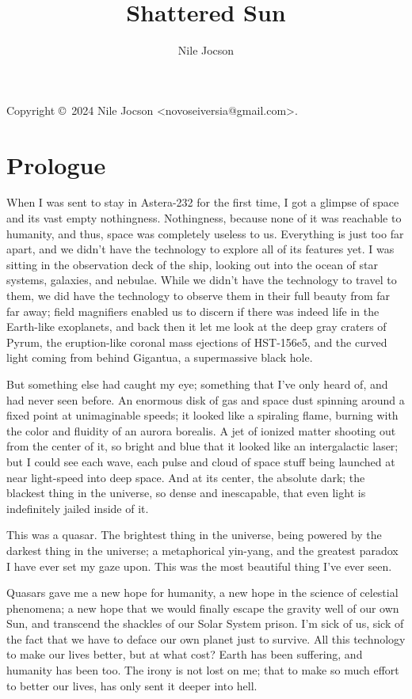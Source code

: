 \documentclass{book}
\title{Shattered Sun}
\author{Nile Jocson}
\begin{document}
	\frontmatter{}
		\maketitle{}

		Copyright \copyright{}~2024 Nile Jocson \textless{}novoseiversia@gmail.com\textgreater{}.



	\mainmatter{}
		\chapter*{Prologue}
			When I was sent to stay in Astera-232 for the first time, I got a glimpse of space and
			its vast empty nothingness. Nothingness, because none of it was reachable to humanity,
			and thus, space was completely useless to us. Everything is just too far apart, and we
			didn't have the technology to explore all of its features yet. I was sitting in the
			observation deck of the ship, looking out into the ocean of star systems, galaxies, and
			nebulae. While we didn't have the technology to travel to them, we did have the technology
			to observe them in their full beauty from far far away; field magnifiers enabled us to
			discern if there was indeed life in the Earth-like exoplanets, and back then it let me
			look at the deep gray craters of Pyrum, the eruption-like coronal mass ejections of
			HST-156e5, and the curved light coming from behind Gigantua, a supermassive black hole.

			But something else had caught my eye; something that I've only heard of, and had never
			seen before. An enormous disk of gas and space dust spinning around a fixed point at
			unimaginable speeds; it looked like a spiraling flame, burning with the color and fluidity
			of an aurora borealis. A jet of ionized matter shooting out from the center of it, so bright
			and blue that it looked like an intergalactic laser; but I could see each wave, each pulse
			and cloud of space stuff being launched at near light-speed into deep space. And at its
			center, the absolute dark; the blackest thing in the universe, so dense and inescapable,
			that even light is indefinitely jailed inside of it.

			This was a quasar. The brightest thing in the universe, being powered by the darkest thing in
			the universe; a metaphorical yin-yang, and the greatest paradox I have ever set my gaze
			upon. This was the most beautiful thing I've ever seen.

			Quasars gave me a new hope for humanity, a new hope in the science of celestial phenomena;
			a new hope that we would finally escape the gravity well of our own Sun, and transcend the
			shackles of our Solar System prison. I'm sick of us, sick of the fact that we have to deface
			our own planet just to survive. All this technology to make our lives better, but at what
			cost? Earth has been suffering, and humanity has been too. The irony is not lost on me; that
			to make so much effort to better our lives, has only sent it deeper into hell.
\end{document}

